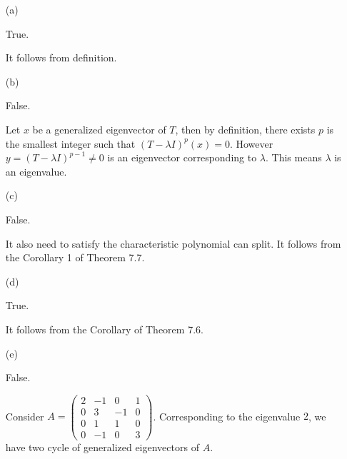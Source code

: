\begin{Exercise}
\begin{enumerate}[(a)]
\item[(a)]
\begin{answer}
True.
\end{answer}
\begin{solution}
It follows from definition.
\end{solution}

\item[(b)]
\begin{answer}
False.
\end{answer}
\begin{solution}
Let $x$ be a generalized eigenvector of $T$, then by definition, there exists $p$ is the smallest integer such that $(T-\lambda I)^p(x) = 0$. However $y = (T-\lambda I)^{p-1}\neq 0$ is an eigenvector corresponding to $\lambda$. This means $\lambda$ is an eigenvalue.
\end{solution}

\item[(c)]
\begin{answer}
False.
\end{answer}
\begin{solution}
It also need to satisfy the characteristic polynomial can split. It follows from the Corollary 1 of Theorem 7.7.
\end{solution}

\item[(d)]
\begin{answer}
True.
\end{answer}
\begin{solution}
It follows from the Corollary of Theorem 7.6.
\end{solution}

\item[(e)]
\begin{answer}
False.
\end{answer}
\begin{solution}
Consider $A = \begin{pmatrix}
2 & -1 & 0 & 1 \\
0 & 3 & -1 & 0 \\
0 & 1 & 1 & 0 \\
0 & -1 & 0 & 3
\end{pmatrix}$. Corresponding to the eigenvalue $2$, we have two cycle of generalized eigenvectors of $A$.
\end{solution}


\end{enumerate}
\end{Exercise}
